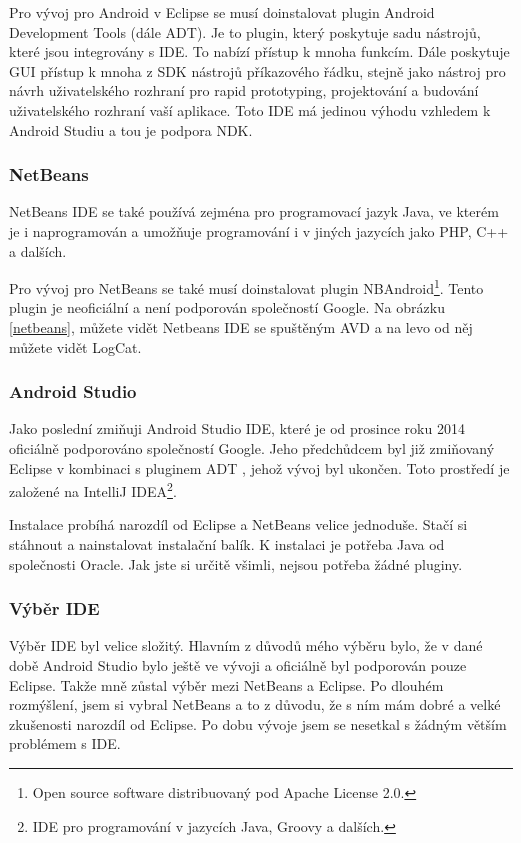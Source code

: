 \documentclass[12pt]{article}
\begin{document}
Pro vývoj pro Android v Eclipse se musí doinstalovat plugin Android Development Tools (dále ADT). Je to plugin, který poskytuje sadu nástrojů, které jsou integrovány s IDE. To nabízí přístup k mnoha funkcím. Dále poskytuje GUI přístup k mnoha z SDK nástrojů příkazového řádku, stejně jako nástroj pro návrh uživatelského rozhraní pro rapid prototyping, projektování a budování uživatelského rozhraní vaší aplikace. Toto IDE má jedinou výhodu vzhledem k Android Studiu a tou je podpora NDK. \cite{eclipse}
\subsubsection{NetBeans}
NetBeans IDE se také používá zejména pro programovací jazyk Java, ve kterém je i naprogramován a umožňuje programování i v jiných jazycích jako PHP, C++ a dalších.

Pro vývoj pro NetBeans se také musí doinstalovat plugin NBAndroid\footnote[6]{Open source software distribuovaný pod Apache License 2.0.}. Tento plugin je neoficiální a není podporován společností Google. Na obrázku \ref{netbeans}, můžete vidět Netbeans IDE se spuštěným AVD a na levo od něj můžete vidět LogCat.
\subsubsection{Android Studio}
Jako poslední zmiňuji Android Studio IDE, které je od prosince roku 2014 oficiálně podporováno společností Google. Jeho předchůdcem byl již zmiňovaný Eclipse v kombinaci s pluginem ADT	, jehož vývoj byl ukončen. Toto prostředí je založené na IntelliJ IDEA\footnote[7]{IDE pro programování v jazycích Java, Groovy a dalších.}.

Instalace probíhá narozdíl od Eclipse a NetBeans velice jednoduše. Stačí si stáhnout a nainstalovat instalační balík. K instalaci je potřeba Java od společnosti Oracle. Jak jste si určitě všimli, nejsou potřeba žádné pluginy. \cite{studio}

\subsubsection{Výběr IDE}
Výběr IDE byl velice složitý. Hlavním z důvodů mého výběru bylo, že v dané době Android Studio bylo ještě ve vývoji a oficiálně byl podporován pouze Eclipse. Takže mně zůstal výběr mezi NetBeans a Eclipse. Po dlouhém rozmýšlení, jsem si vybral NetBeans a to z důvodu, že s ním mám dobré a velké zkušenosti narozdíl od Eclipse. Po dobu vývoje jsem se nesetkal s žádným větším problémem s IDE.
\end{document}
